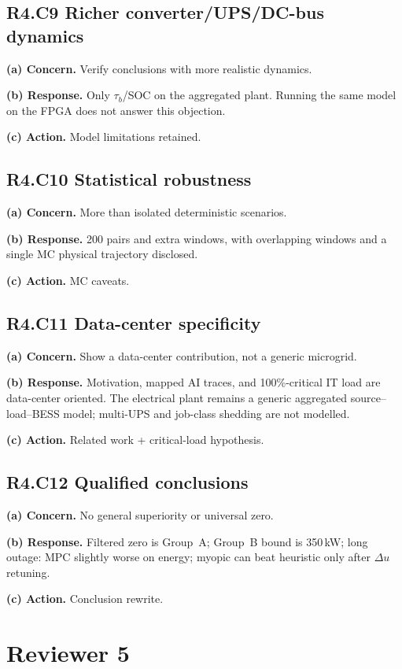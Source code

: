 \documentclass[11pt]{article}
\begin{document}
\subsection*{R4.C9 Richer converter/UPS/DC-bus dynamics}
\textbf{(a) Concern.} Verify conclusions with more realistic dynamics.

\textbf{(b) Response.} Only $\tau_b$/SOC on the aggregated plant. Running the same model on the FPGA does not answer this objection.

\textbf{(c) Action.} Model limitations retained.

\subsection*{R4.C10 Statistical robustness}
\textbf{(a) Concern.} More than isolated deterministic scenarios.

\textbf{(b) Response.} 200 pairs and extra windows, with overlapping windows and a single MC physical trajectory disclosed.

\textbf{(c) Action.} MC caveats.

\subsection*{R4.C11 Data-center specificity}
\textbf{(a) Concern.} Show a data-center contribution, not a generic microgrid.

\textbf{(b) Response.} Motivation, mapped AI traces, and 100\%-critical IT load are data-center oriented. The electrical plant remains a generic aggregated source--load--BESS model; multi-UPS and job-class shedding are not modelled.

\textbf{(c) Action.} Related work + critical-load hypothesis.

\subsection*{R4.C12 Qualified conclusions}
\textbf{(a) Concern.} No general superiority or universal zero.

\textbf{(b) Response.} Filtered zero is Group~A; Group~B bound is 350\,kW; long outage: MPC slightly worse on energy; myopic can beat heuristic only after $\Delta u$ retuning.

\textbf{(c) Action.} Conclusion rewrite.

\section*{Reviewer 5}
\end{document}
